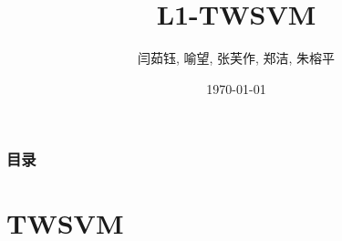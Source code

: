 \documentclass{beamer}
\title[L1-TWSVM]{L1-TWSVM} %
\author{闫茹钰, 喻望, 张芙作, 郑洁, 朱榕平} %
\institute %
{
自动化系 \\ %
}
\date{\today} %
\begin{document}
\begin{frame}
\titlepage %
\end{frame}

\begin{frame}
\frametitle{目录} %
\tableofcontents %
\end{frame}


\section{TWSVM} %
\end{document}
